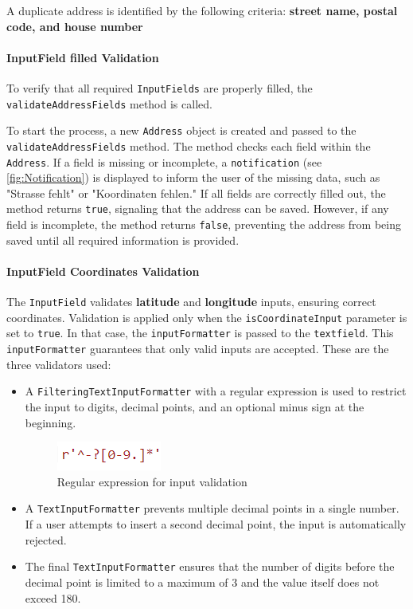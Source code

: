     \blankLine
    
    A duplicate address is identified by the following criteria:
    \textbf{street name, postal code, and house number}
    

\paragraph*{InputField filled Validation}
To verify that all required \texttt{InputFields} are properly filled, the \texttt{validateAddressFields} method is called.

To start the process, a new \texttt{Address} object is created and passed to the \texttt{validateAddressFields} method. The method checks each field within the \texttt{Address}. If a field is missing or incomplete, a \texttt{notification} (see \ref{fig:Notification}) is displayed to inform the user of the missing data, such as "Strasse fehlt" or "Koordinaten fehlen." If all fields are correctly filled out, the method returns \texttt{true}, signaling that the address can be saved. However, if any field is incomplete, the method returns \texttt{false}, preventing the address from being saved until all required information is provided.



\paragraph*{InputField Coordinates Validation}
\label{fig:InputField Coordinates Validation}
    The \texttt{InputField} validates \textbf{latitude} and \textbf{longitude} inputs, ensuring correct coordinates. Validation is applied only when the \texttt{isCoordinateInput} parameter is set to \texttt{true}. In that case, the \texttt{inputFormatter} is passed to the \texttt{textfield}. This \texttt{inputFormatter} guarantees that only valid inputs are accepted. These are the three validators used:


    \begin{itemize}
        \item A \texttt{FilteringTextInputFormatter} with a regular expression is used to restrict the input to digits, decimal points, and an optional minus sign at the beginning.
        \begin{figure}[H]
            \centering
            \includegraphics[width=0.2\linewidth]{images/AdminPanel/regexInputFormatter.png}
            \caption{Regular expression for input validation}
        \end{figure}
        \item A \texttt{TextInputFormatter} prevents multiple decimal points in a single number. If a user attempts to insert a second decimal point, the input is automatically rejected.
        \item The final \texttt{TextInputFormatter} ensures that the number of digits before the decimal point is limited to a maximum of 3 and the value itself does not exceed 180.
    \end{itemize}
    
